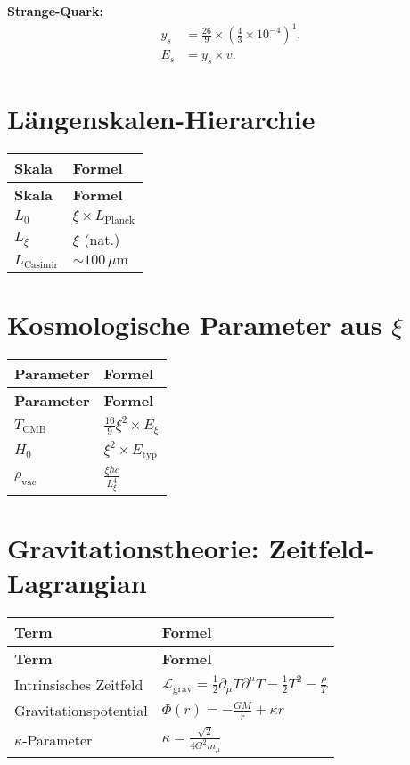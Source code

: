 \documentclass[12pt,a4paper]{article}
\begin{document}
	\textbf{Strange-Quark:}
	\begin{align}
		y_s &= \frac{26}{9} \times \left(\frac{4}{3} \times 10^{-4}\right)^{1}, \\
		E_s &= y_s \times v.
	\end{align}
	
	\section{Längenskalen-Hierarchie}
	\begin{longtable}{|p{5cm}|p{6cm}|}
		\hline
		\textbf{Skala} & \textbf{Formel} \\
		\hline
		\endfirsthead
		\hline
		\textbf{Skala} & \textbf{Formel} \\
		\hline
		\endhead
		$L_0$ & $\xi \times L_{\text{Planck}}$ \\
		\hline
		$L_{\xi}$ & $\xi$ (nat.) \\
		\hline
		$L_{\text{Casimir}}$ & $\sim 100 \, \mu\text{m}$ \\
		\hline
	\end{longtable}
	
	\section{Kosmologische Parameter aus $\xi$}
	\begin{longtable}{|p{5cm}|p{6cm}|}
		\hline
		\textbf{Parameter} & \textbf{Formel} \\
		\hline
		\endfirsthead
		\hline
		\textbf{Parameter} & \textbf{Formel} \\
		\hline
		\endhead
		$T_{\text{CMB}}$ & $\frac{16}{9}\xi^{2} \times E_{\xi}$ \\
		\hline
		$H_0$ & $\xi^{2} \times E_{\text{typ}}$ \\
		\hline
		$\rho_{\text{vac}}$ & $\frac{\xi\hbar c}{L_{\xi}^{4}}$ \\
		\hline
	\end{longtable}
	
	\section{Gravitationstheorie: Zeitfeld-Lagrangian}
	\begin{longtable}{|p{5cm}|p{6cm}|}
		\hline
		\textbf{Term} & \textbf{Formel} \\
		\hline
		\endfirsthead
		\hline
		\textbf{Term} & \textbf{Formel} \\
		\hline
		\endhead
		Intrinsisches Zeitfeld & $\mathcal{L}_{\text{grav}} = \frac{1}{2}\partial_{\mu}T\partial^{\mu}T - \frac{1}{2}T^{2} - \frac{\rho}{T}$ \\
		\hline
		Gravitationspotential & $\Phi(r) = -\frac{GM}{r} + \kappa r$ \\
		\hline
		$\kappa$-Parameter & $\kappa = \frac{\sqrt{2}}{4G^{2}m_{\mu}}$ \\
		\hline
	\end{longtable}
	
\end{document}
